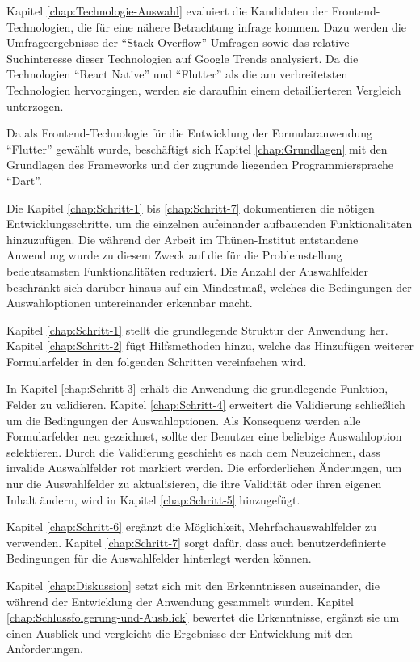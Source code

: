 

Kapitel \ref{chap:Technologie-Auswahl} evaluiert die Kandidaten der Frontend-Technologien,
die für eine nähere Betrachtung infrage kommen.
Dazu werden die Umfrageergebnisse der \enquote{Stack Overflow}-Umfragen sowie das relative Suchinteresse dieser Technologien auf Google Trends analysiert.
Da die Technologien \enquote{React Native} und  \enquote{Flutter} als die am verbreitetsten Technologien hervorgingen,
werden sie daraufhin einem detaillierteren Vergleich unterzogen.

Da als Frontend-Technologie für die Entwicklung der Formularanwendung \enquote{Flutter} gewählt wurde,
beschäftigt sich Kapitel \ref{chap:Grundlagen} mit den Grundlagen des Frameworks und der zugrunde liegenden Programmiersprache \enquote{Dart}.

Die Kapitel \ref{chap:Schritt-1} bis \ref{chap:Schritt-7} dokumentieren die nötigen Entwicklungsschritte,
um die einzelnen aufeinander aufbauenden  Funktionalitäten hinzuzufügen.
Die während der Arbeit im Thünen-Institut entstandene Anwendung wurde zu diesem Zweck auf die für die  Problemstellung bedeutsamsten Funktionalitäten reduziert.
Die Anzahl der Auswahlfelder beschränkt sich darüber hinaus auf ein Mindestmaß,
welches die Bedingungen der Auswahloptionen untereinander erkennbar macht. 

Kapitel \ref{chap:Schritt-1} stellt die grundlegende Struktur der Anwendung her. Kapitel \ref{chap:Schritt-2} fügt Hilfsmethoden hinzu,
welche  das Hinzufügen  weiterer Formularfelder  in den folgenden Schritten vereinfachen wird.

In Kapitel \ref{chap:Schritt-3} erhält die Anwendung die grundlegende Funktion,
Felder zu validieren.
Kapitel \ref{chap:Schritt-4} erweitert die Validierung schließlich um die Bedingungen der Auswahloptionen.
Als Konsequenz werden alle Formularfelder neu gezeichnet,
sollte  der Benutzer eine beliebige Auswahloption selektieren.
Durch die Validierung  geschieht es nach dem Neuzeichnen,
dass invalide Auswahlfelder rot markiert werden.
Die erforderlichen Änderungen,
um nur die Auswahlfelder zu aktualisieren,
die ihre Validität oder ihren eigenen Inhalt ändern,
wird in Kapitel \ref{chap:Schritt-5} hinzugefügt.

Kapitel \ref{chap:Schritt-6} ergänzt die Möglichkeit,
Mehrfachauswahlfelder zu verwenden.
Kapitel \ref{chap:Schritt-7} sorgt dafür,
dass auch benutzerdefinierte Bedingungen für die Auswahlfelder hinterlegt werden können.

Kapitel \ref{chap:Diskussion} setzt sich mit den Erkenntnissen auseinander,
die während der Entwicklung der Anwendung gesammelt wurden.
Kapitel \ref{chap:Schlussfolgerung-und-Ausblick} bewertet die Erkenntnisse,
ergänzt sie um einen Ausblick und vergleicht die Ergebnisse der Entwicklung mit den Anforderungen.
